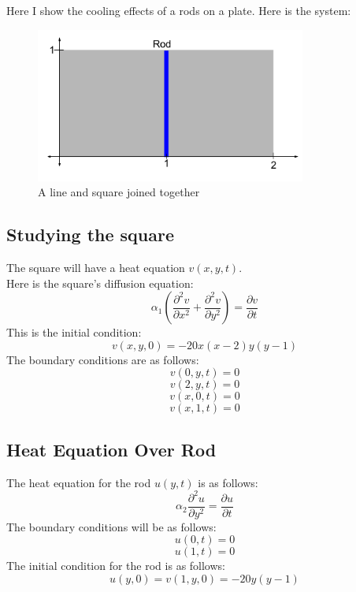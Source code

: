 \documentclass[twoside,11pt]{article}
\theoremstyle{definition}
\begin{document}
Here I show the cooling effects of a rods on a plate. Here is the system:
\begin{figure}[h]
\centering
\includegraphics[height=2in]{PlateAndRod.png}
\caption{A line and square joined together}
\end{figure}

\subsection{Studying the square}

The square will have a heat equation $v(x,y,t)$. \\
Here is the square's diffusion equation:
\[
\alpha_1 (\frac{\partial^2 v}{\partial x^2} + \frac{\partial^2 v}{\partial y^2}) = \frac{\partial v}{\partial t}
\]
This is the initial condition:
\[
v(x,y,0) = -20x(x-2)y(y-1)
\]
The boundary conditions are as follows:
\[
v(0,y,t)=0
\]
\[
v(2,y,t)=0
\]
\[
v(x,0,t)=0
\]
\[
v(x,1,t)=0
\]

\newpage
\subsection{Heat Equation Over Rod}

The heat equation for the rod $u(y,t)$ is as follows:
\[
\alpha_2 \frac{\partial^2 u}{\partial y^2} = \frac{\partial u}{\partial t}
\]
The boundary conditions will be as follows:
\[
u(0,t)=0
\]
\[
u(1,t)=0
\]
The initial condition for the rod is as follows:
\[
u(y,0)=v(1,y,0)=-20y(y-1)
\]
\end{document}
